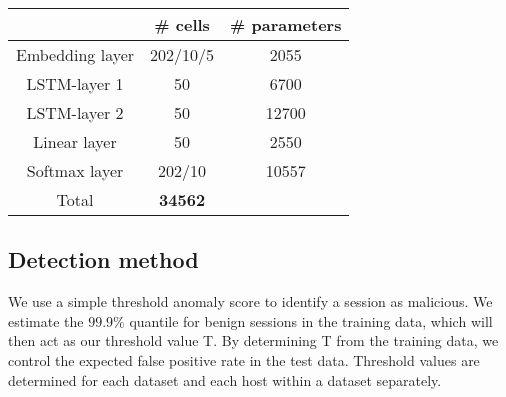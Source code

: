 
\begin{table}[ht]
\centering
\begin{tabular}{c|c|c}
&\# cells &\# parameters\\ \hline
Embedding layer&202/10/5 &2055\\ %
LSTM-layer 1&50 & 6700\\ %
LSTM-layer 2 & 50 & 12700\\ %
Linear layer & 50 & 2550\\ %
Softmax layer & 202/10 & 10557\\ \hline %
Total &\textbf{34562}
\end{tabular}
\end{table}

\subsection{Detection method}

We use a simple threshold anomaly score to identify a session as malicious. We estimate the $99.9\%$ quantile for benign sessions in the training data, which will then act as our threshold value T. By determining T from the training data, we control the expected false positive rate in the test data. Threshold values are determined for each dataset and each host within a dataset separately. 

